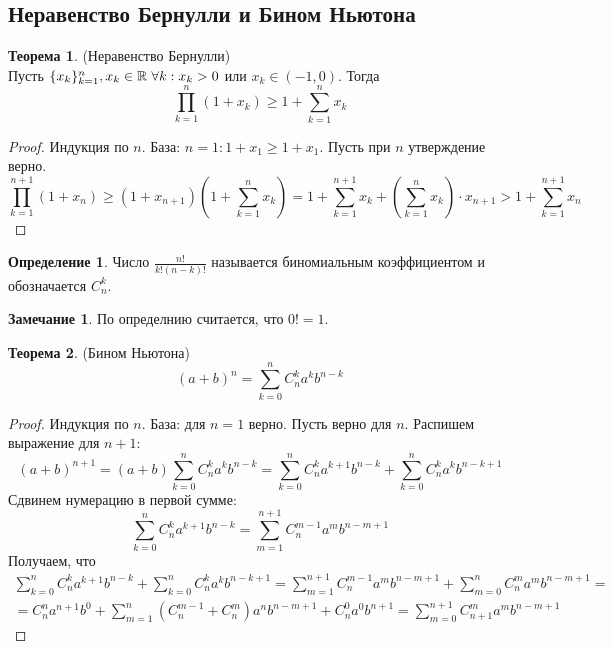 \documentclass[a4paper, 12pt]{article}
\newcommand{\R}{\mathbb{R}}
\newcommand\tab[1][.5cm]{\hspace*{#1}}
\theoremstyle{definition}
\newtheorem*{definition}{Определение}
\newtheorem*{theorem}{Теорема}
\newtheorem*{comm}{Замечание}
\begin{document}
        \subsection{Неравенство Бернулли и Бином Ньютона}
        \begin{theorem} (Неравенство Бернулли)\\
            Пусть $\{x_k\}_{k=1}^n, x_k\in \R \tab[3pt] \forall k: x_k>0$ или $x_k\in (-1, 0)$. Тогда
            \[\prod\limits_{k=1}^n(1+x_k)\geq 1+\sum\limits_{k=1}^nx_k\]
        \end{theorem} 
        \begin{proof}
            Индукция по $n$.
            База: $n=1: 1+x_1\geq 1+x_1$.
            Пусть при $n$ утверждение верно.
            \[\prod\limits_{k=1}^{n+1}(1+x_n)\geq(1+x_{n+1})(1+\sum\limits_{k=1}^nx_k)=1+\sum\limits_{k=1}^{n+1}x_k+(\sum\limits_{k=1}^{n}x_k)\cdot x_{n+1}> 1+\sum\limits_{k=1}^{n+1}x_n\]
        \end{proof}
        \begin{definition}
            Число $\frac{n!}{k!(n-k)!}$ называется биномиальным коэффициентом и обозначается $C_n^k$.
        \end{definition} 
        \begin{comm}
            По определнию считается, что $0!=1$.
        \end{comm} 
        \begin{theorem} (Бином Ньютона)
            \[(a+b)^n=\sum\limits_{k=0}^n C_n^k a^k b^{n-k}\]
        \end{theorem} 
        \begin{proof}
            Индукция по $n$. База: для $n=1$ верно. Пусть верно для $n$. Распишем выражение для $n+1$:
            \[(a+b)^{n+1}=(a+b)\sum\limits_{k=0}^n C_n^k a^k b^{n-k}=\sum\limits_{k=0}^n C_n^k a^{k+1} b^{n-k}+\sum\limits_{k=0}^n C_n^k a^k b^{n-k+1}\]
            Сдвинем нумерацию в первой сумме:
            \[\sum\limits_{k=0}^n C_n^k a^{k+1} b^{n-k}=\sum\limits_{m=1}^{n+1} C_n^{m-1} a^{m} b^{n-m+1}\]
            Получаем, что
            \begin{multline*}
            \sum\limits_{k=0}^n C_n^k a^{k+1} b^{n-k}+\sum\limits_{k=0}^n C_n^k a^k b^{n-k+1}=\sum\limits_{m=1}^{n+1} C_n^{m-1} a^{m} b^{n-m+1}+\sum\limits_{m=0}^n C_n^m a^m b^{n-m+1}=\\=C_n^n a^{n+1}b^0+\sum\limits_{m=1}^n(C_n^{m-1}+C_n^m)a^n b^{n-m+1}+C_n^0a^0b^{n+1}=\sum\limits_{m=0}^{n+1}C_{n+1}^m a^m b^{n-m+1}
            \end{multline*}
        \end{proof} 
\end{document}
